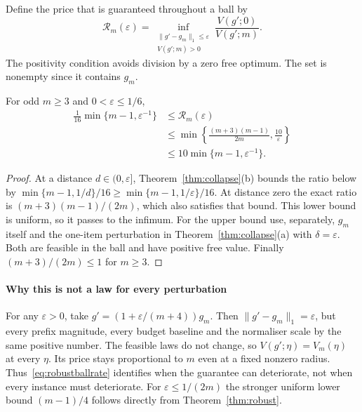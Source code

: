 Define the price that is guaranteed throughout a ball by
\begin{equation}
\mathcal R_m(\varepsilon)=
\inf_{\substack{\|g'-g_m\|_1\le\varepsilon\\V(g';m)>0}}
\frac{V(g';0)}{V(g';m)}.
\label{eq:robustball}
\end{equation}
The positivity condition avoids division by a zero free optimum. The set is nonempty since
it contains $g_m$.

\begin{corollary}
\label{cor:robustball}
For odd $m\ge3$ and $0<\varepsilon\le1/6$,
\begin{align}
\frac1{16}\min\{m-1,\varepsilon^{-1}\}
&\le \mathcal R_m(\varepsilon)\nonumber\\
&\le\min\left\{\frac{(m+3)(m-1)}{2m},\frac{10}{\varepsilon}\right\}\nonumber\\
&\le10\min\{m-1,\varepsilon^{-1}\}.
\label{eq:robustballrate}
\end{align}
\end{corollary}
\begin{proof}
At a distance $d\in(0,\varepsilon]$, Theorem~\ref{thm:collapse}(b) bounds the ratio below by
$\min\{m-1,1/d\}/16\ge\min\{m-1,1/\varepsilon\}/16$.
At distance zero the exact ratio is $(m+3)(m-1)/(2m)$, which also satisfies that bound.
This lower bound is uniform, so it passes to the infimum.
For the upper bound use, separately, $g_m$ itself and the one-item perturbation in
Theorem~\ref{thm:collapse}(a) with $\delta=\varepsilon$. Both are feasible in the ball and
have positive free value. Finally $(m+3)/(2m)\le1$ for $m\ge3$.
\end{proof}

\paragraph{Why this is not a law for every perturbation}
For any $\varepsilon>0$, take $g'=(1+\varepsilon/(m+4))g_m$.
Then $\|g'-g_m\|_1=\varepsilon$, but every prefix magnitude, every budget baseline and the
normaliser scale by the same positive number. The feasible laws do not change, so
$V(g';\eta)=V_m(\eta)$ at every $\eta$. Its price stays proportional to $m$ even at a fixed
nonzero radius. Thus~\eqref{eq:robustballrate} identifies when the guarantee can deteriorate,
not when every instance must deteriorate. For $\varepsilon\le1/(2m)$ the stronger uniform
lower bound $(m-1)/4$ follows directly from Theorem~\ref{thm:robust}.

